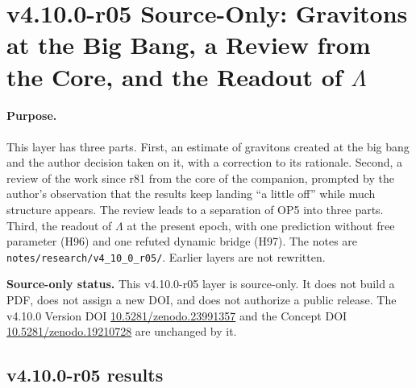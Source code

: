 \clearpage
\section*{v4.10.0-r05 Source-Only: Gravitons at the Big Bang, a Review from the Core, and the Readout of \texorpdfstring{\(\Lambda\)}{Lambda}}
\label{sec:v4100-r05-core-review}

\paragraph{Purpose.}
This layer has three parts.  First, an estimate of gravitons created at the big bang and the author decision taken on it, with a correction to its
rationale.  Second, a review of the work since r81 from the core of the companion, prompted by the author's observation that the results keep
landing ``a little off'' while much structure appears.  The review leads to a separation of OP5 into three parts.  Third, the readout of \(\Lambda\)
at the present epoch, with one prediction without free parameter (H96) and one refuted dynamic bridge (H97).
The notes are \texttt{notes/\allowbreak research/\allowbreak v4\_10\_0\_r05/}.  Earlier layers are not rewritten.

\noindent\textbf{Source-only status.}
This v4.10.0-r05 layer is source-only.  It does not build a PDF, does not assign a new DOI,
and does not authorize a public release.  The v4.10.0 Version DOI
\href{https://doi.org/10.5281/zenodo.23991357}{10.5281/zenodo.23991357} and the Concept DOI
\href{https://doi.org/10.5281/zenodo.19210728}{10.5281/zenodo.19210728} are unchanged by it.

\subsection*{v4.10.0-r05 results}
\label{subsec:v4100-r05-results}

